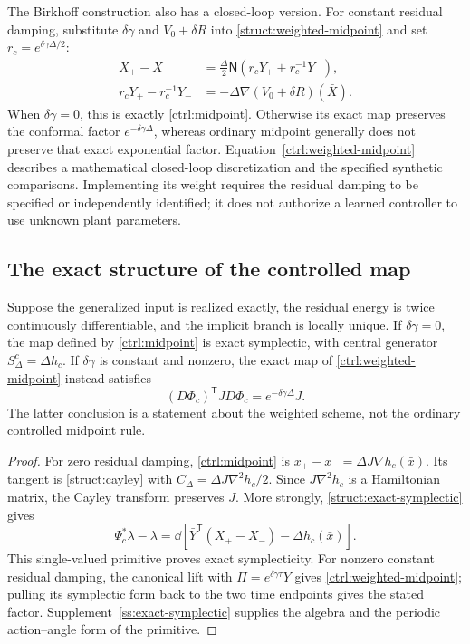 The Birkhoff construction also has a closed-loop version. For constant residual damping, substitute $\delta\gamma$ and $V_0+\delta R$ into \eqref{struct:weighted-midpoint} and set $r_c=e^{\delta\gamma\Delta/2}$:
\begin{equation}\label{ctrl:weighted-midpoint}
\begin{aligned}
 X_+-X_-&=\tfrac{\Delta}{2}\mathsf N
                  (r_cY_++r_c^{-1}Y_-),\\
 r_cY_+-r_c^{-1}Y_-&=-\Delta\nabla(V_0+\delta R)(\bar X).
\end{aligned}
\end{equation}
When $\delta\gamma=0$, this is exactly \eqref{ctrl:midpoint}. Otherwise its exact map preserves the conformal factor $e^{-\delta\gamma\Delta}$, whereas ordinary midpoint generally does not preserve that exact exponential factor. Equation~\eqref{ctrl:weighted-midpoint} describes a mathematical closed-loop discretization and the specified synthetic comparisons. Implementing its weight requires the residual damping to be specified or independently identified; it does not authorize a learned controller to use unknown plant parameters.

\subsection{The exact structure of the controlled map}
\label{ctrl:structure}

\begin{proposition}
\label{ctrl:structure-proposition}
Suppose the generalized input is realized exactly, the residual energy is twice continuously differentiable, and the implicit branch is locally unique. If $\delta\gamma=0$, the map defined by \eqref{ctrl:midpoint} is exact symplectic, with central generator $S_\Delta^c=\Delta h_c$. If $\delta\gamma$ is constant and nonzero, the exact map of \eqref{ctrl:weighted-midpoint} instead satisfies
\[
 (D\Phi_c)^{\mathsf T}JD\Phi_c=e^{-\delta\gamma\Delta}J.
\]
The latter conclusion is a statement about the weighted scheme, not the ordinary controlled midpoint rule.
\end{proposition}

\begin{proof}
For zero residual damping, \eqref{ctrl:midpoint} is
$x_+-x_-=\Delta J\nabla h_c(\bar x)$. Its tangent is \eqref{struct:cayley} with $C_\Delta=\Delta J\nabla^2h_c/2$. Since $J\nabla^2h_c$ is a Hamiltonian matrix, the Cayley transform preserves $J$. More strongly, \eqref{struct:exact-symplectic} gives
\begin{equation}\label{ctrl:exact-primitive}
 \Psi_c^*\lambda-\lambda
 =\dd[\bar Y^{\mathsf T}(X_+-X_-)-\Delta h_c(\bar x)].
\end{equation}
This single-valued primitive proves exact symplecticity. For nonzero constant residual damping, the canonical lift with
$\Pi=e^{\delta\gamma\tau}Y$ gives \eqref{ctrl:weighted-midpoint}; pulling its symplectic form back to the two time endpoints gives the stated factor. Supplement~\ref{ss:exact-symplectic} supplies the algebra and the periodic action--angle form of the primitive.
\end{proof}


